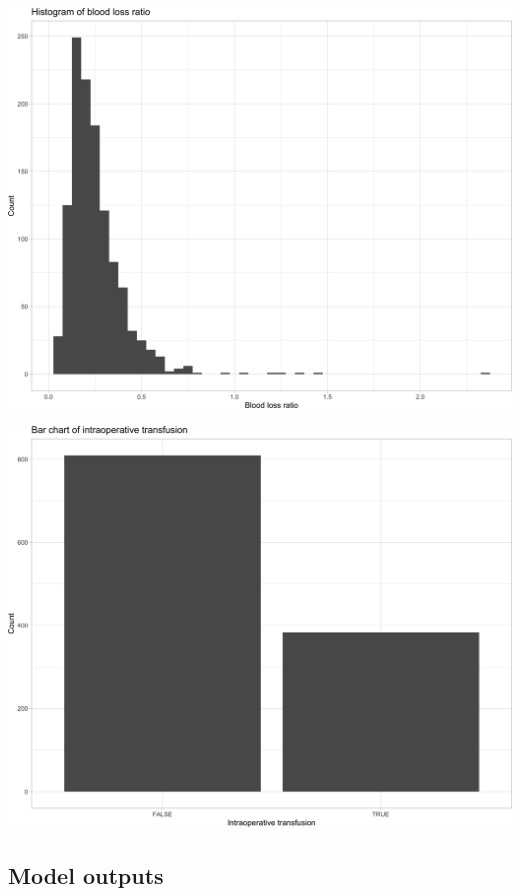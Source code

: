 \documentclass[
]{article}
\begin{document}
\begin{center}\includegraphics[width=1\linewidth]{notebook_files/figure-latex/data_plots-2} \end{center}

\begin{center}\includegraphics[width=1\linewidth]{notebook_files/figure-latex/data_plots-3} \end{center}

\hypertarget{model-outputs}{%
\subsection{Model outputs}\label{model-outputs}}
\end{document}
